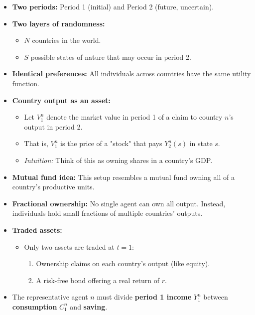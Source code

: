 \documentclass[12pt]{article}
\begin{document}
\begin{itemize}
\begin{itemize}
    \item \textbf{Two periods:} Period 1 (initial) and Period 2 (future, uncertain).
    \item \textbf{Two layers of randomness:}
    \begin{itemize}
        \item \( N \) countries in the world.
        \item \( S \) possible states of nature that may occur in period 2.
    \end{itemize}
    \item \textbf{Identical preferences:} All individuals across countries have the same utility function.
    \item \textbf{Country output as an asset:} 
    \begin{itemize}
        \item Let \( V_1^n \) denote the market value in period 1 of a claim to country \( n \)'s output in period 2.
        \item That is, \( V_1^n \) is the price of a "stock" that pays \( Y_2^n(s) \) in state \( s \).
        \item \textit{Intuition:} Think of this as owning shares in a country’s GDP.
    \end{itemize}
    \item \textbf{Mutual fund idea:} This setup resembles a mutual fund owning all of a country’s productive units.
    \item \textbf{Fractional ownership:} No single agent can own all output. Instead, individuals hold small fractions of multiple countries' outputs.
    \item \textbf{Traded assets:}
    \begin{itemize}
        \item Only two assets are traded at \( t = 1 \): 
        \begin{enumerate}
            \item Ownership claims on each country's output (like equity).
            \item A risk-free bond offering a real return of \( r \).
        \end{enumerate}
    \end{itemize}
\end{itemize}

\begin{itemize}
    \item The representative agent \( n \) must divide \textbf{period 1 income} \( Y_1^n \) between \textbf{consumption} \( C_1^n \) and \textbf{saving}.
    

\end{itemize}
\end{itemize}
\end{document}
